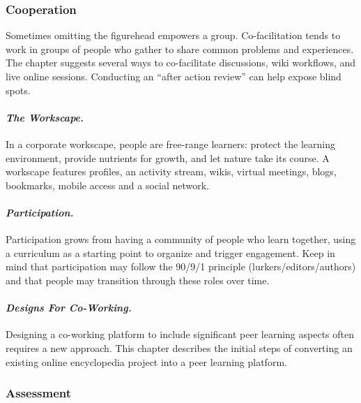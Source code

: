 \hypertarget{cooperation}{%
\subsubsection{Cooperation}\label{cooperation}}

Sometimes omitting the figurehead empowers a group. Co-facilitation
tends to work in groups of people who gather to share common problems
and experiences. The chapter suggests several ways to co-facilitate
discussions, wiki workflows, and live online sessions. Conducting an
``after action review'' can help expose blind spots.

\hypertarget{the-workscape.}{%
\paragraph{\texorpdfstring{\emph{The
Workscape.}}{The Workscape.}}\label{the-workscape.}}

In a corporate workscape, people are free-range learners: protect the
learning environment, provide nutrients for growth, and let nature take
its course. A workscape features profiles, an activity stream, wikis,
virtual meetings, blogs, bookmarks, mobile access and a social network.

\hypertarget{participation.}{%
\paragraph{\texorpdfstring{\emph{Participation.}}{Participation.}}\label{participation.}}

Participation grows from having a community of people who learn
together, using a curriculum as a starting point to organize and trigger
engagement. Keep in mind that participation may follow the 90/9/1
principle (lurkers/editors/authors) and that people may transition
through these roles over time.

\hypertarget{designs-for-co-working.}{%
\paragraph{\texorpdfstring{\emph{Designs For
Co-Working.}}{Designs For Co-Working.}}\label{designs-for-co-working.}}

Designing a co-working platform to include significant peer learning
aspects often requires a new approach. This chapter describes the
initial steps of converting an existing online encyclopedia project into
a peer learning platform.

\hypertarget{assessment}{%
\subsubsection{Assessment}\label{assessment}}

